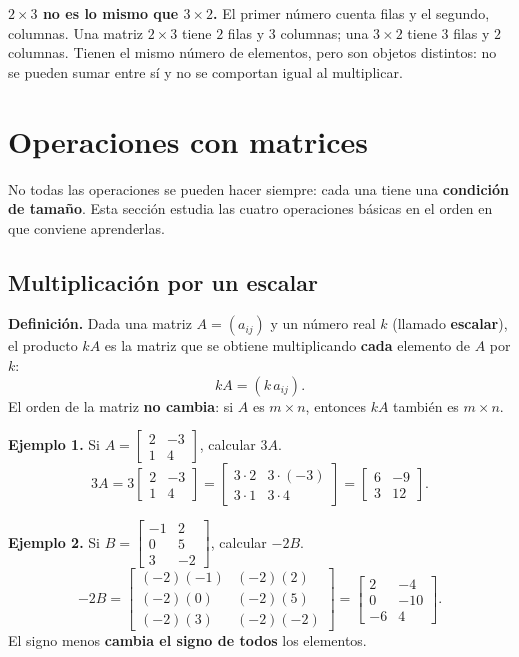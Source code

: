 \documentclass[12pt, letterpaper]{article}
\newcommand{\mwmat}[1]{\ensuremath{\begin{bmatrix}#1\end{bmatrix}}}
\begin{document}
\begin{cuadroadvertencia}
  \small
  \textbf{$2\times3$ no es lo mismo que $3\times2$.} El primer número cuenta
  filas y el segundo, columnas. Una matriz $2\times3$ tiene $2$ filas y $3$
  columnas; una $3\times2$ tiene $3$ filas y $2$ columnas. Tienen el mismo
  número de elementos, pero son objetos distintos: no se pueden sumar entre
  sí y no se comportan igual al multiplicar.
\end{cuadroadvertencia}

\section{Operaciones con matrices}

No todas las operaciones se pueden hacer siempre: cada una tiene una
\textbf{condición de tamaño}. Esta sección estudia las cuatro operaciones
básicas en el orden en que conviene aprenderlas.

\subsection{Multiplicación por un escalar}

\begin{cuadroteoria}
  \small
  \textbf{Definición.} Dada una matriz $A=(a_{ij})$ y un número real $k$
  (llamado \textbf{escalar}), el producto $kA$ es la matriz que se obtiene
  multiplicando \textbf{cada} elemento de $A$ por $k$:
  \[
    kA=(k\,a_{ij}).
  \]
  El orden de la matriz \textbf{no cambia}: si $A$ es $m\times n$, entonces
  $kA$ también es $m\times n$.
\end{cuadroteoria}

\begin{cuadrosolucion}
  \small
  \textbf{Ejemplo 1.} Si $A=\mwmat{2 & -3\\ 1 & 4}$, calcular $3A$.
  \[
    3A=3\mwmat{2 & -3\\ 1 & 4}=\mwmat{3\cdot2 & 3\cdot(-3)\\ 3\cdot1 & 3\cdot4}
    =\mwmat{6 & -9\\ 3 & 12}.
  \]
\end{cuadrosolucion}

\begin{cuadrosolucion}
  \small
  \textbf{Ejemplo 2.} Si $B=\mwmat{-1 & 2\\ 0 & 5\\ 3 & -2}$, calcular $-2B$.
  \[
    -2B=\mwmat{(-2)(-1) & (-2)(2)\\ (-2)(0) & (-2)(5)\\ (-2)(3) & (-2)(-2)}
    =\mwmat{2 & -4\\ 0 & -10\\ -6 & 4}.
  \]
  El signo menos \textbf{cambia el signo de todos} los elementos.
\end{cuadrosolucion}
\end{document}
